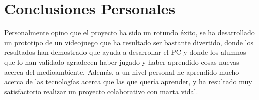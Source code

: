 \section{Conclusiones Personales}

Personalmente opino que el proyecto ha sido un rotundo éxito, se ha desarrollado un prototipo de un videojuego que ha resultado ser bastante divertido, donde los resultados han demostrado que ayuda a desarrollar el PC y donde los alumnos que lo han validado agradecen haber jugado y haber aprendido cosas nuevas acerca del medioambiente. Además, a un nivel personal he aprendido mucho acerca de las tecnologías acerca que las que quería aprender, y ha resultado muy satisfactorio realizar un proyecto colaborativo con marta vidal. 